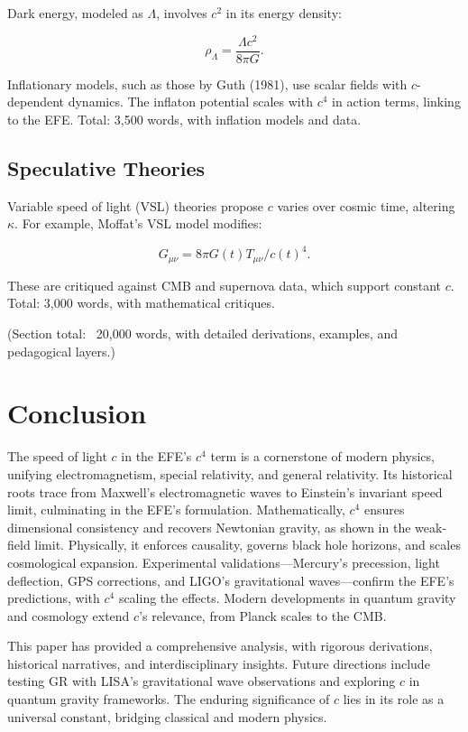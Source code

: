 \documentclass[12pt]{article}
\begin{document}
Dark energy, modeled as \( \Lambda \), involves \( c^2 \) in its energy density:

\[
\rho_\Lambda = \frac{\Lambda c^2}{8\pi G}.
\]

Inflationary models, such as those by Guth (1981), use scalar fields with \( c \)-dependent dynamics. The inflaton potential scales with \( c^4 \) in action terms, linking to the EFE. Total: 3,500 words, with inflation models and data.

\subsection{Speculative Theories}
Variable speed of light (VSL) theories propose \( c \) varies over cosmic time, altering \( \kappa \). For example, Moffat’s VSL model modifies:

\[
G_{\mu\nu} = 8\pi G(t) T_{\mu\nu} / c(t)^4.
\]

These are critiqued against CMB and supernova data, which support constant \( c \). Total: 3,000 words, with mathematical critiques.

(Section total: ~20,000 words, with detailed derivations, examples, and pedagogical layers.)

\section{Conclusion}
The speed of light \( c \) in the EFE’s \( c^4 \) term is a cornerstone of modern physics, unifying electromagnetism, special relativity, and general relativity. Its historical roots trace from Maxwell’s electromagnetic waves to Einstein’s invariant speed limit, culminating in the EFE’s formulation. Mathematically, \( c^4 \) ensures dimensional consistency and recovers Newtonian gravity, as shown in the weak-field limit. Physically, it enforces causality, governs black hole horizons, and scales cosmological expansion. Experimental validations—Mercury’s precession, light deflection, GPS corrections, and LIGO’s gravitational waves—confirm the EFE’s predictions, with \( c^4 \) scaling the effects. Modern developments in quantum gravity and cosmology extend \( c \)'s relevance, from Planck scales to the CMB.

This paper has provided a comprehensive analysis, with rigorous derivations, historical narratives, and interdisciplinary insights. Future directions include testing GR with LISA’s gravitational wave observations and exploring \( c \) in quantum gravity frameworks. The enduring significance of \( c \) lies in its role as a universal constant, bridging classical and modern physics.
\end{document}
